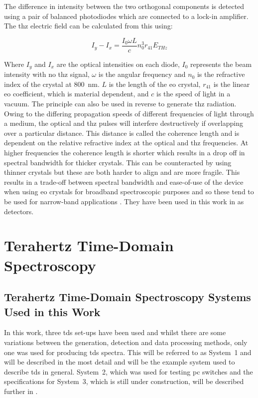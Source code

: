 The difference in intensity between the two orthogonal components is detected using a pair of balanced photodiodes which are connected to a lock\nobreakdash-in amplifier. The \acrshort{thz} electric field can be calculated from this using:

\begin{equation}
I_y - I_x = \frac{I_0 \omega L}{c} n_0^3 r_{41} E_{THz}
\end{equation}

Where \(I_y\) and \(I_x\) are the optical intensities on each diode, \(I_0\) represents the beam intensity with no \acrshort{thz} signal, \(\omega\) is the angular frequency and \(n_0\) is the refractive index of the crystal at \SI{800}{nm}. \(L\) is the length of the \acrshort{eo} crystal, \(r_{41}\) is the linear \acrshort{eo} coefficient, which is material dependent, and \(c\) is the speed of light in a vacuum. The principle can also be used in reverse to generate \acrshort{thz} radiation. Owing to the differing propagation speeds of different frequencies of light through a medium, the optical and \acrshort{thz} pulses will interfere destructively if overlapping over a particular distance. This distance is called the coherence length and is dependent on the relative refractive index at the optical and \acrshort{thz} frequencies. At higher frequencies the coherence length is shorter which results in a drop off in spectral bandwidth for thicker crystals. This can be counteracted by using thinner crystals but these are both harder to align and are more fragile. This results in a trade\nobreakdash-off between spectral bandwidth and ease\nobreakdash-of\nobreakdash-use of the device when using \acrshort{eo} crystals for broadband spectroscopic purposes and so these tend to be used for narrow-band applications \DIFdelbegin \DIFdel{~}\DIFdelend \cite{Watanabe2018}. They have been used in this work in  as detectors.

\section{Terahertz Time-Domain Spectroscopy}
\subsection{Terahertz Time-Domain Spectroscopy Systems Used in this Work}
\label{subsec:tdssystems}
In this work, three \acrshort{tds} set\nobreakdash-ups have been used and whilst there are some variations between the generation, detection and data processing methods, only one was used for producing \acrshort{tds} spectra. This will be referred to as System~1 and will be described in the most detail and will be the example system used to describe \acrshort{tds} in general. System~2, which was used for testing \acrshort{pc} switches and the specifications for System~3, which is still under construction, will be described further in .

